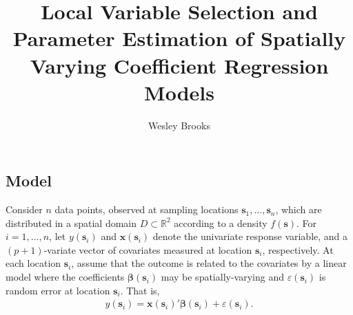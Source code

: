 \documentclass[authoryear, review, 11pt]{elsarticle}
\title{Local Variable Selection and Parameter Estimation of Spatially Varying Coefficient Regression Models}
\author{Wesley Brooks}
\date{}                                           %
\begin{document}

\maketitle

	\subsection{Model}	
	Consider $n$ data points, observed at sampling locations $\bm{s}_1, \dots, \bm{s}_n$, which are distributed in a spatial domain $D \subset \mathbb{R}^2$ according to a density $f(\bm{s})$. For $i = 1, \dots, n$, let $y(\bm{s}_i)$ and $\bm{x}(\bm{s}_i)$ denote the univariate response variable, and a $(p+1)$-variate vector of covariates measured at location $\bm{s}_i$, respectively. At each location $\bm{s}_i$, assume that the outcome is related to the covariates by a linear model where the coefficients $\bm{\beta}(\bm{s}_i)$ may be spatially-varying and $\varepsilon(\bm{s}_i)$ is random error at location $\bm{s}_i$. That is,
	\begin{align}\label{eq:lm(s)}
		y(\bm{s}_i) = \bm{x}(\bm{s}_i)' \bm{\beta}(\bm{s}_i) + \varepsilon(\bm{s}_i).
	\end{align}
	
\end{document}

